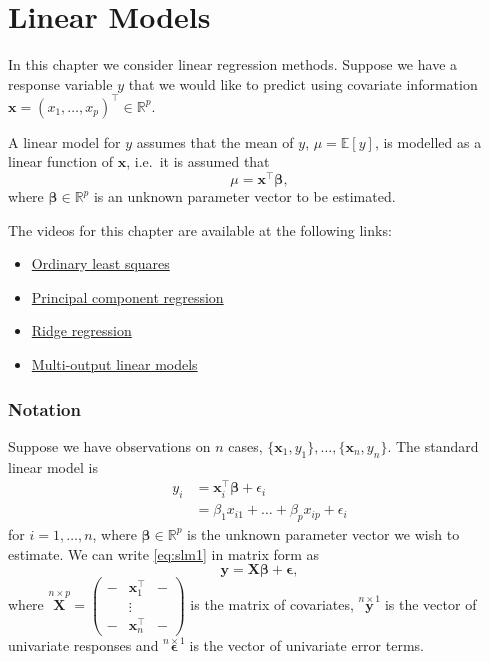 \documentclass[
]{book}
\providecommand{\tightlist}{%
  \setlength{\itemsep}{0pt}\setlength{\parskip}{0pt}}
\theoremstyle{definition}
\theoremstyle{definition}
\theoremstyle{definition}
\theoremstyle{definition}
\theoremstyle{remark}
\begin{document}
\hypertarget{lm}{%
\chapter{Linear Models}\label{lm}}

In this chapter we consider linear regression methods. Suppose we have a response variable \(y\) that we would like to predict using covariate information \(\mathbf x=(x_1, \ldots, x_p)^\top \in \mathbb{R}^p\).

A linear model for \(y\) assumes that the mean of \(y\), \(\mu={\mathbb{E}}[y]\), is modelled as a linear function of \(\mathbf x\), i.e.~it is assumed that
\[
\mu = \mathbf x^\top \boldsymbol \beta,
\]
where \(\boldsymbol \beta\in \mathbb{R}^p\) is an unknown parameter vector to be estimated.

The videos for this chapter are available at the following links:

\begin{itemize}
\tightlist
\item
  \href{https://mediaspace.nottingham.ac.uk/media/Linear+ModelsA+Ordinary+Least+Squares/1_ytvk0uc6}{Ordinary least squares}
\item
  \href{https://mediaspace.nottingham.ac.uk/media/Linear+ModelsA+Principal+Component+Regression/1_h0l11uvw}{Principal component regression}
\item
  \href{https://mediaspace.nottingham.ac.uk/media/Linear+ModelsA+Ridge+Regression/1_rjnxkukd}{Ridge regression}
\item
  \href{https://mediaspace.nottingham.ac.uk/media/Linear+modelsA+multi-output+models/1_f61kjm7u}{Multi-output linear models}
\end{itemize}

\hypertarget{notation-3}{%
\subsection*{Notation}\label{notation-3}}

Suppose we have observations on \(n\) cases, \(\{\mathbf x_1, y_1\}, \ldots, \{\mathbf x_n, y_n\}\). The standard linear model is
\begin{align}
y_i &= \mathbf x_i^\top \boldsymbol \beta+\epsilon_i
\label{eq:slm1}\\
&=\beta_1 x_{i1}+\ldots+\beta_p x_{ip}+\epsilon_i
\end{align}
for \(i=1, \ldots , n\),
where \(\boldsymbol \beta\in \mathbb{R}^p\) is the unknown parameter vector we wish to estimate. We can write \eqref{eq:slm1} in matrix form as
\begin{equation}
\mathbf y=\mathbf X\boldsymbol \beta+{\pmb \epsilon},
\label{eq:slm2}
\end{equation}
where \(\stackrel{n \times p}{\mathbf X}= \begin{pmatrix} - & \mathbf x_1^\top &-\\ &\vdots&\\ -&\mathbf x_n^\top&-\end{pmatrix}\) is the matrix of covariates,
\(\stackrel{n \times 1}{\mathbf y}\) is the vector of univariate responses and \(\stackrel{n \times 1}{\pmb \epsilon}\) is the vector of univariate error terms.
\end{document}
